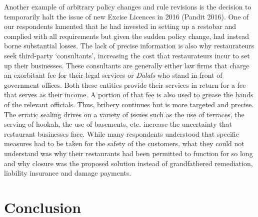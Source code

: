 \documentclass[a4paper, 12pt]{article}
\begin{document}
		Another example of arbitrary policy changes and rule revisions is the decision to temporarily halt the issue of new Excise Licences in 2016 (Pandit 2016). One of our respondents lamented that he had invested in setting up a restobar and complied with all requirements but given the sudden policy change, had instead borne substantial losses. The lack of precise information is also why restaurateurs seek third-party ‘consultants’, increasing the cost that restaurateurs incur to set up their businesses. These consultants are generally either law firms that charge an exorbitant fee for their legal services or \textit{Dalals} who stand in front of government offices. Both these entities provide their services in return for a fee that serves as their income. A portion of that fee is also used to grease the hands of the relevant officials. Thus, bribery continues but is more targeted and precise.\\
		The erratic sealing drives on a variety of issues such as the use of terraces, the serving of hookah, the use of basements, etc. increase the uncertainty that restaurant businesses face. While many respondents understood that specific measures had to be taken for the safety of the customers, what they could not understand was why their restaurants had been permitted to function for so long and why closure was the proposed solution instead of grandfathered remediation, liability insurance and damage payments.\\
		



		\section*{Conclusion}
		\label{end}
		
\end{document}
